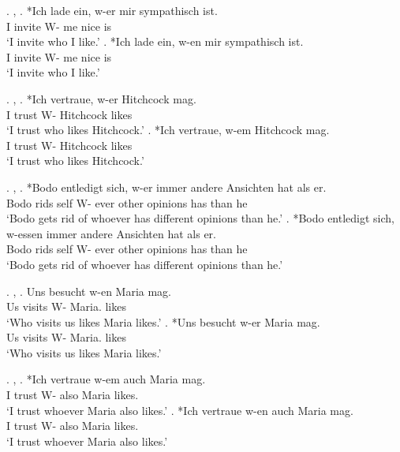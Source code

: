 \ex. , 
\ag. *Ich {lade ein}, w-er mir sympathisch ist.\\
 I invite\scsub{[acc]} W- me nice is\scsub{[nom]}\\
 `I invite who I like.' \hfill \citep[344]{vogel2001}
\bg. *Ich {lade ein}, w-en mir sympathisch ist.\\
 I invite\scsub{[acc]} W- me nice is\scsub{[nom]}\\
 `I invite who I like.' \hfill \citep[344]{vogel2001}

\ex. , 
\ag. *Ich vertraue, w-er Hitchcock mag.\\
 I trust\scsub{[dat]} W- Hitchcock likes\scsub{[nom]}\\
 `I trust who likes Hitchcock.' \hfill \citep[345]{vogel2001}
\bg. *Ich vertraue, w-em Hitchcock mag.\\
 I trust\scsub{[dat]} W- Hitchcock likes\scsub{[nom]}\\
 `I trust who likes Hitchcock.' \hfill \citep[345]{vogel2001}

\ex. , 
\ag. *Bodo entledigt sich, w-er immer andere Ansichten hat als er.\\
 Bodo rids\scsub{[gen]} self W- ever other opinions has\scsub{[nom]} than he\\
 `Bodo gets rid of whoever has different opinions than he.' \hfill \citep[345]{vogel2001}
\bg. *Bodo entledigt sich, w-essen immer andere Ansichten hat als er.\\
 Bodo rids\scsub{[gen]} self  W- ever other opinions has\scsub{[nom]} than he\\
 `Bodo gets rid of whoever has different opinions than he.' \hfill \citep[345]{vogel2001}

\ex. , 
\ag. Uns besucht w-en Maria mag.\\
 Us visits\scsub{[nom]} W- Maria. likes\scsub{[acc]}\\
 `Who visits us likes Maria likes.' \hfill \citep[343]{vogel2001}
\bg. *Uns besucht w-er Maria mag.\\
 Us visits\scsub{[nom]} W- Maria. likes\scsub{[acc]}\\
 `Who visits us likes Maria likes.' \hfill \citep[343]{vogel2001}

 \ex. , 
\ag. *Ich vertraue w-em auch Maria mag. \\
 I trust\scsub{[dat]} W- also Maria likes\scsub{[acc]}.\\
 `I trust whoever Maria also likes.' \hfill \citep[345]{vogel2001}
\bg. *Ich vertraue w-en auch Maria mag. \\
 I trust\scsub{[dat]} W- also Maria likes\scsub{[acc]}.\\
 `I trust whoever Maria also likes.' \hfill \citep[345]{vogel2001}

